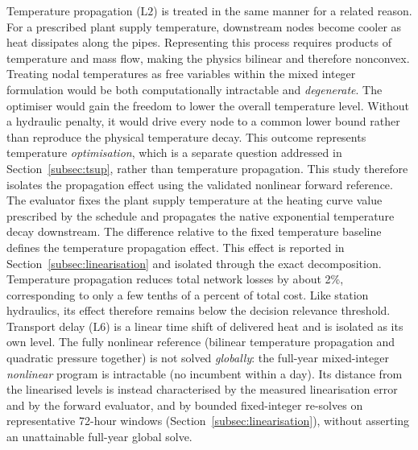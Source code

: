 \documentclass[a4paper,fleqn]{cas-sc}
\newcommand{\Ltwo}{\ensuremath{\mathrm{L2}}}    %
\newcommand{\Lsix}{\ensuremath{\mathrm{L6}}}    %
\begin{document}
Temperature propagation ($\Ltwo$) is treated in the same manner for a related reason.
For a prescribed plant supply temperature, downstream nodes become cooler as heat
dissipates along the pipes. Representing this process requires products of temperature
and mass flow, making the physics bilinear and therefore nonconvex. Treating nodal
temperatures as free variables within the mixed integer formulation would be both
computationally intractable and \emph{degenerate}. The optimiser would gain the freedom
to lower the overall temperature level. Without a hydraulic penalty, it would drive
every node to a common lower bound rather than reproduce the physical temperature
decay. This outcome represents temperature \emph{optimisation}, which is a separate
question addressed in Section~\ref{subsec:tsup}, rather than temperature propagation.
This study therefore isolates the propagation effect using the validated nonlinear
forward reference. The evaluator fixes the plant supply temperature at the heating
curve value prescribed by the schedule and propagates the native exponential
temperature decay downstream. The difference relative to the fixed temperature
baseline defines the temperature propagation effect. This effect is reported in
Section~\ref{subsec:linearisation} and isolated through the exact decomposition.
Temperature propagation reduces total network losses by about 2\%, corresponding to
only a few tenths of a percent of total cost. Like station hydraulics, its effect
therefore remains below the decision relevance threshold.
Transport delay ($\Lsix$) is a linear time shift of delivered heat and is isolated as its own
level. The fully nonlinear reference (bilinear temperature propagation and quadratic
pressure together) is not solved \emph{globally}: the full-year mixed-integer
\emph{nonlinear} program is intractable (no incumbent within a day). Its distance from the
linearised levels is instead characterised by the measured linearisation error and by the
forward evaluator, and by bounded fixed-integer re-solves on representative 72-hour windows
(Section~\ref{subsec:linearisation}), without asserting an unattainable full-year global solve.
\end{document}
